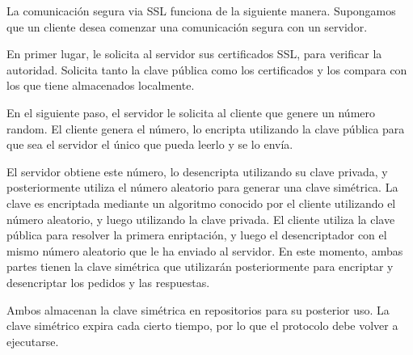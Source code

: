 La comunicación segura via SSL funciona de la siguiente manera. Supongamos que un cliente desea comenzar una comunicación segura con un servidor.

En primer lugar, le solicita al servidor sus certificados SSL, para verificar la autoridad. Solicita tanto la clave pública como los certificados y los compara con los que tiene almacenados localmente.

En el siguiente paso, el servidor le solicita al cliente que genere un número random. El cliente genera el número, lo encripta utilizando la clave pública para que sea el servidor el único que pueda leerlo y se lo envía.

El servidor obtiene este número, lo desencripta utilizando su clave privada, y posteriormente utiliza el número aleatorio para generar una clave simétrica. La clave es encriptada mediante un algoritmo conocido por el cliente utilizando el número aleatorio, y luego utilizando la clave privada. El cliente utiliza la clave pública para resolver la primera enriptación, y luego el desencriptador con el mismo número aleatorio que le ha enviado al servidor. En este momento, ambas partes tienen la clave simétrica que utilizarán posteriormente para encriptar y desencriptar los pedidos y las respuestas.

Ambos almacenan la clave simétrica en repositorios para su posterior uso. La clave simétrico expira cada cierto tiempo, por lo que el protocolo debe volver a ejecutarse.
